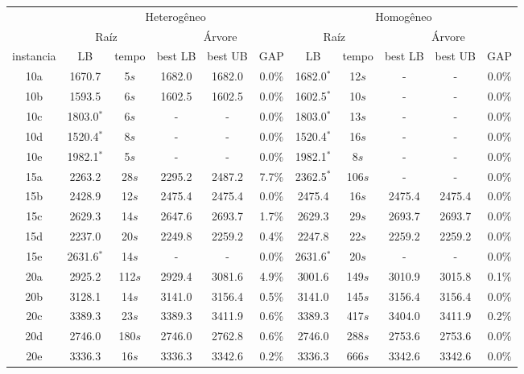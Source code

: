 \documentclass[12pt]{article}
\begin{document}
\begin{table}[!htb]
\centering
\footnotesize
\begin{tabular}{|c|c|c|c|c|c||c|c|c|c|c|}
\cline{2-11}
\multicolumn{1}{c}{} & \multicolumn{5}{|c||}{Heterog\^eneo} & \multicolumn{5}{c|}{Homog\^eneo} \\
\cline{2-11}
\multicolumn{1}{c}{} & \multicolumn{2}{|c|}{Ra\'iz} & \multicolumn{3}{c||}{\'Arvore} & \multicolumn{2}{c|}{Ra\'iz} & \multicolumn{3}{c|}{\'Arvore}\\
\hline
instancia & LB & tempo & best LB & best UB & GAP & LB & tempo & best LB & best UB & GAP \\
\hline
10a & 1670.7 & 5$s$ & 1682.0 & 1682.0 & 0.0\% & 1682.0$^*$ & 12$s$ & - & - & 0.0\% \\
10b & 1593.5 & 6$s$ & 1602.5 & 1602.5 & 0.0\% & 1602.5$^*$ & 10$s$ & - & - & 0.0\% \\
10c & 1803.0$^*$ & 6$s$ & - & - & 0.0\% & 1803.0$^*$ & 13$s$ & - & - & 0.0\% \\
10d & 1520.4$^*$ & 8$s$ & - & - & 0.0\% & 1520.4$^*$ & 16$s$ & - & - & 0.0\%\\
10e & 1982.1$^*$ & 5$s$ & - & - & 0.0\% & 1982.1$^*$ & 8$s$ & - & - & 0.0\%\\
\hline \hline
15a & 2263.2 & 28$s$ & 2295.2 & 2487.2 & 7.7\% & 2362.5$^*$ & 106$s$ & - & - & 0.0\% \\
15b & 2428.9 & 12$s$ & 2475.4 & 2475.4 & 0.0\% & 2475.4 & 16$s$ & 2475.4 & 2475.4 & 0.0\% \\
15c & 2629.3 & 14$s$ & 2647.6 & 2693.7 & 1.7\% & 2629.3 & 29$s$ & 2693.7 & 2693.7 & 0.0\% \\
15d & 2237.0 & 20$s$ & 2249.8 & 2259.2 & 0.4\% & 2247.8 & 22$s$ & 2259.2 & 2259.2 & 0.0\% \\
15e & 2631.6$^*$ & 14$s$ & - & - & 0.0\% & 2631.6$^*$ & 20$s$ & - & - & 0.0\% \\
\hline \hline
20a & 2925.2 & 112$s$ & 2929.4 & 3081.6 & 4.9\% & 3001.6 & 149$s$ & 3010.9 & 3015.8 & 0.1\% \\
20b & 3128.1 & 14$s$ & 3141.0 & 3156.4 & 0.5\% & 3141.0 & 145$s$ & 3156.4 & 3156.4 & 0.0\%\\
20c & 3389.3 & 23$s$ & 3389.3 & 3411.9 & 0.6\% & 3389.3 & 417$s$ & 3404.0 & 3411.9 & 0.2\%\\
20d & 2746.0 & 180$s$ & 2746.0 & 2762.8 & 0.6\% & 2746.0 & 288$s$ & 2753.6 & 2753.6 & 0.0\% \\
20e & 3336.3 & 16$s$ & 3336.3 & 3342.6 & 0.2\% & 3336.3 & 666$s$ & 3342.6 & 3342.6 & 0.0\% \\

\end{tabular}
\end{table}
\end{document}
